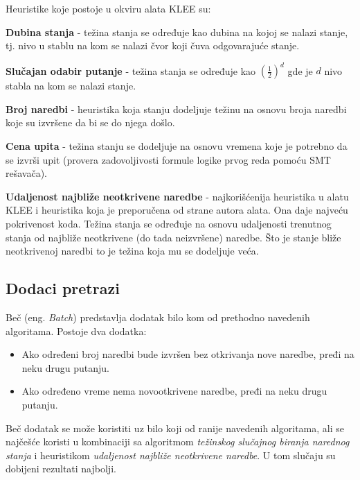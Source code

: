 \documentclass[12pt,oneside]{memoir}
\begin{document}
Heuristike koje postoje u okviru alata KLEE su:
\begin{description}
    \item\textbf{Dubina stanja} - težina stanja se određuje kao dubina na kojoj se nalazi stanje, tj. nivo u stablu na kom se nalazi čvor koji čuva odgovarajuće stanje.
    
    \item\textbf{Slučajan odabir putanje} - težina stanja se određuje kao $(\frac{1}{2}) ^ d$ gde je $d$ nivo stabla na kom se nalazi stanje.
    
    \item\textbf{Broj naredbi} - heuristika koja stanju dodeljuje težinu na osnovu broja naredbi koje su izvršene da bi se do njega došlo.
    
    \item\textbf{Cena upita} - težina stanju se dodeljuje na osnovu vremena koje je potrebno da se izvrši upit (provera zadovoljivosti formule logike prvog reda pomoću SMT rešavača).
    
    \item\textbf{Udaljenost najbliže neotkrivene naredbe} - najkorišćenija heuristika u alatu KLEE i heuristika koja je preporučena od strane autora alata. Ona daje najveću pokrivenost koda. Težina stanja se određuje na osnovu udaljenosti trenutnog stanja od najbliže neotkrivene (do tada neizvršene) naredbe. Što je stanje bliže neotkrivenoj naredbi to je težina koja mu se dodeljuje veća. 
\end{description}

\bigskip

\subsection{Dodaci pretrazi} 
Beč (eng. \textit{Batch}) predstavlja dodatak bilo kom od prethodno navedenih algoritama. Postoje dva dodatka:
\begin{itemize}
    \item Ako određeni broj naredbi bude izvršen bez otkrivanja nove naredbe, pređi na neku drugu putanju.
    
    \item Ako određeno vreme nema novootkrivene naredbe, pređi na neku drugu putanju.
\end{itemize}
Beč dodatak se može koristiti uz bilo koji od ranije navedenih algoritama, ali se najčešće koristi u kombinaciji sa algoritmom \textit{težinskog slučajnog biranja narednog stanja} i heuristikom \textit{udaljenost najbliže neotkrivene naredbe}. U tom slučaju su dobijeni rezultati najbolji.
\end{document}
